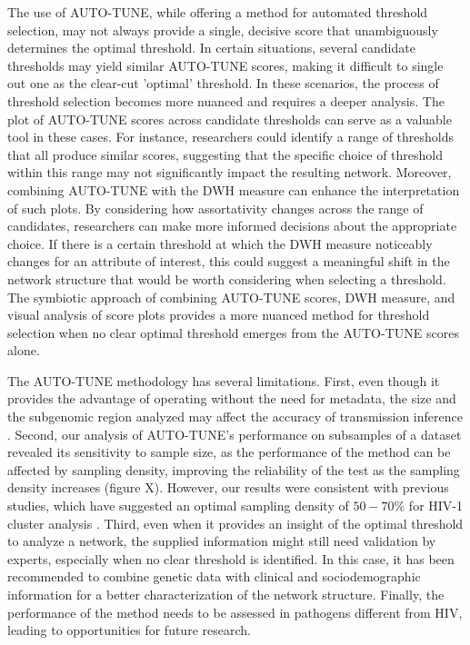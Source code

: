 \documentclass[utf8]{FrontiersinHarvard} %
\newcommand{\TODO}[1]{{\color{red}{#1}}}
\begin{document}
The use of AUTO-TUNE, while offering a method for automated threshold
selection, may not always provide a single, decisive score that unambiguously
determines the optimal threshold. In certain situations, several candidate
thresholds may yield similar AUTO-TUNE scores, making it difficult to single
out one as the clear-cut 'optimal' threshold. \TODO{VDC -- when would it be
	more likely to have those scenarios? Is it with lower sampling densities,
	heterogeneous epidemics (e.g. multiple HIV subtypes or risk groups within the
	network)?} In these scenarios, the process of threshold selection becomes more
nuanced and requires a deeper analysis. The plot of AUTO-TUNE scores across
candidate thresholds can serve as a valuable tool in these cases. For instance,
researchers could identify a range of thresholds that all produce similar
scores, suggesting that the specific choice of threshold within this range may
not significantly impact the resulting network. Moreover, combining AUTO-TUNE
with the DWH measure can enhance the interpretation of such plots. By
considering how assortativity changes across the range of candidates,
researchers can make more informed decisions about the appropriate choice. If
there is a certain threshold at which the DWH measure noticeably changes for an
attribute of interest, this could suggest a meaningful shift in the network
structure that would be worth considering when selecting a threshold. The
symbiotic approach of combining AUTO-TUNE scores, DWH measure, and visual
analysis of score plots provides a more nuanced method for threshold selection
when no clear optimal threshold emerges from the AUTO-TUNE scores alone.

The AUTO-TUNE methodology has several limitations. First, even though it
provides the advantage of operating without the need for metadata, the size and
the subgenomic region analyzed may affect the accuracy of transmission
inference \citep{junqueira_factors_2019}. Second, our analysis of AUTO-TUNE's
performance on subsamples of a dataset revealed its sensitivity to sample size,
as the performance of the method can be affected by sampling density, improving
the reliability of the test as the sampling density increases (figure X).
However, our results were consistent with previous studies, which have
suggested an optimal sampling density of $50-70\%$ for HIV-1 cluster analysis
\citep{novitsky_impact_2014}. Third, even when it provides an insight of the
optimal threshold to analyze a network, the supplied information might still
need validation by experts, especially when no clear threshold is identified.
In this case, it has been recommended to combine genetic data with clinical and
sociodemographic information for a better characterization of the network
structure. Finally, the performance of the method needs to be assessed in
pathogens different from HIV, leading to opportunities for future research.
\end{document}
